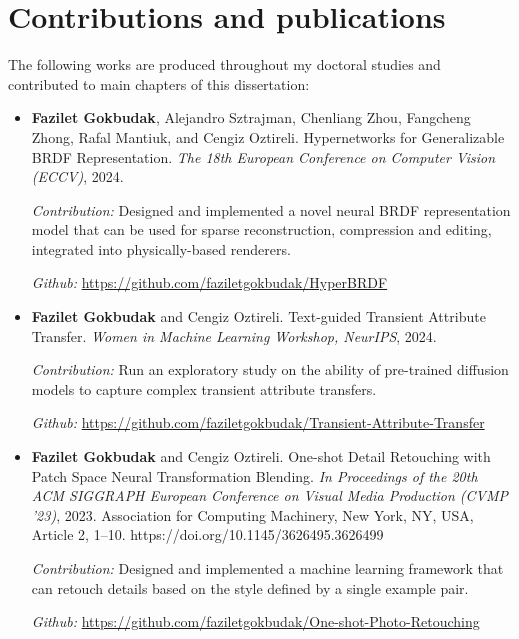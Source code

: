 \section{Contributions and publications}

The following works are produced throughout my doctoral studies and contributed to main chapters of this dissertation:

\begin{itemize}

\item \textbf{Fazilet Gokbudak}, Alejandro Sztrajman, Chenliang Zhou,  Fangcheng Zhong, Rafal Mantiuk, and Cengiz Oztireli. Hypernetworks for Generalizable BRDF Representation. \textit{The 18th European Conference on Computer Vision (ECCV)}, 2024.

\textit{Contribution:} Designed and implemented a novel neural BRDF representation model that can be used for sparse reconstruction, compression and editing, integrated into physically-based renderers.

\textit{Github:} \url{https://github.com/faziletgokbudak/HyperBRDF}

\item \textbf{Fazilet Gokbudak} and Cengiz Oztireli. Text-guided Transient Attribute Transfer. \textit{Women in Machine Learning Workshop, NeurIPS}, 2024.

\textit{Contribution:} Run an exploratory study on the ability of pre-trained diffusion models to capture complex transient attribute transfers.

\textit{Github:} \url{https://github.com/faziletgokbudak/Transient-Attribute-Transfer}

\item \textbf{Fazilet Gokbudak} and Cengiz Oztireli. One-shot Detail Retouching with Patch Space Neural Transformation Blending. \textit{In Proceedings of the 20th ACM SIGGRAPH European Conference on Visual Media Production (CVMP '23)}, 2023. Association for Computing Machinery, New York, NY, USA, Article 2, 1–10. https://doi.org/10.1145/3626495.3626499

\textit{Contribution:} Designed and implemented a machine learning framework that can retouch details based on the style defined by a single example pair. 

\textit{Github:} \url{https://github.com/faziletgokbudak/One-shot-Photo-Retouching}
\end{itemize}

